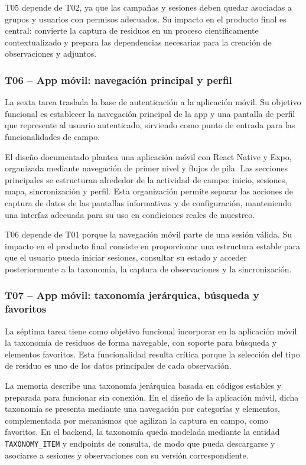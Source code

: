 T05 depende de T02, ya que las campañas y sesiones deben quedar asociadas a grupos
y usuarios con permisos adecuados. Su impacto en el producto final es central:
convierte la captura de residuos en un proceso científicamente contextualizado y
prepara las dependencias necesarias para la creación de observaciones y adjuntos.

\subsubsection{T06 -- App móvil: navegación principal y perfil}

La sexta tarea traslada la base de autenticación a la aplicación móvil. Su objetivo
funcional es establecer la navegación principal de la app y una pantalla de perfil
que represente al usuario autenticado, sirviendo como punto de entrada para las
funcionalidades de campo.

El diseño documentado plantea una aplicación móvil con React Native y Expo,
organizada mediante navegación de primer nivel y flujos de pila. Las secciones
principales se estructuran alrededor de la actividad de campo: inicio, sesiones,
mapa, sincronización y perfil. Esta organización permite separar las acciones de
captura de datos de las pantallas informativas y de configuración, manteniendo una
interfaz adecuada para su uso en condiciones reales de muestreo.

T06 depende de T01 porque la navegación móvil parte de una sesión válida. Su impacto
en el producto final consiste en proporcionar una estructura estable para que el
usuario pueda iniciar sesiones, consultar su estado y acceder posteriormente a la
taxonomía, la captura de observaciones y la sincronización.

\subsubsection{T07 -- App móvil: taxonomía jerárquica, búsqueda y favoritos}

La séptima tarea tiene como objetivo funcional incorporar en la aplicación móvil la
taxonomía de residuos de forma navegable, con soporte para búsqueda y elementos
favoritos. Esta funcionalidad resulta crítica porque la selección del tipo de
residuo es uno de los datos principales de cada observación.

La memoria describe una taxonomía jerárquica basada en códigos estables y preparada
para funcionar sin conexión. En el diseño de la aplicación móvil, dicha taxonomía
se presenta mediante una navegación por categorías y elementos, complementada por
mecanismos que agilizan la captura en campo, como favoritos. En el backend, la
taxonomía queda modelada mediante la entidad \texttt{TAXONOMY\_ITEM} y endpoints de
consulta, de modo que pueda descargarse y asociarse a sesiones y observaciones con
su versión correspondiente.

